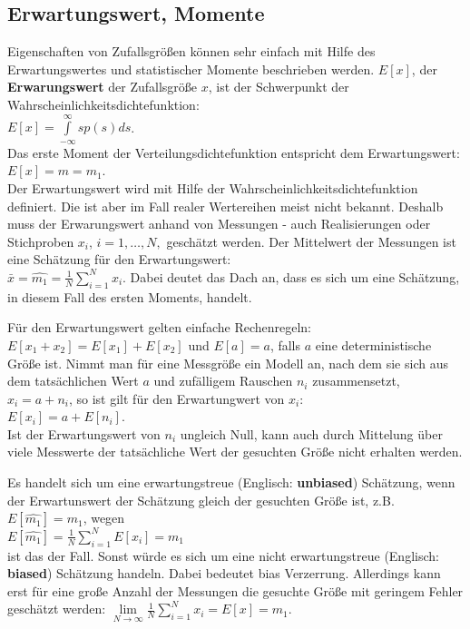 \subsection{Erwartungswert, Momente}
Eigenschaften von Zufallsgrößen können sehr einfach mit Hilfe des Erwartungswertes und statistischer Momente beschrieben werden.  $E[x]$, der {\bf Erwarungswert} der Zufallsgröße $x$, ist der Schwerpunkt der Wahrscheinlichkeitsdichtefunktion:\\
 $E[x] = \int\limits_{-\infty}^{\infty}sp(s)ds$.\\
Das erste Moment der Verteilungsdichtefunktion entspricht dem Erwartungswert: \\
$E[x]=m=m_1$.\\
Der Erwartungswert wird mit Hilfe der Wahrscheinlichkeitsdichtefunktion definiert. Die ist aber im Fall realer Wertereihen meist nicht bekannt. Deshalb muss der Erwarungswert anhand von Messungen - auch Realisierungen oder Stichproben $x_i$,   $i=1,\dots, N,$  geschätzt werden. Der Mittelwert der Messungen ist eine Schätzung für den Erwartungswert:\\
$\bar{x}=\hat{m_1}=\frac{1}{N}\sum \limits_{i=1}^N x_i$.
Dabei deutet das Dach an, dass es sich um eine Schätzung, in diesem Fall des ersten Moments, handelt. 

Für den Erwartungswert gelten einfache Rechenregeln:\\ 
 $E[x_1+x_2]=E[x_1]+E[x_2]$ und $E[a]=a$, falls $a$ eine deterministische Größe ist. Nimmt man für eine Messgröße ein Modell an, nach dem sie sich aus dem tatsächlichen Wert $a$ und zufälligem Rauschen $n_i$  zusammensetzt, $x_i = a + n_i$, so ist gilt für den Erwartungwert von $x_i$:\\
$E[x_i] = a + E[n_i]$.\\
 Ist der Erwartungswert von $n_i$ ungleich Null, kann auch durch Mittelung über viele Messwerte der tatsächliche Wert der gesuchten Größe nicht erhalten werden.

Es handelt sich um eine erwartungstreue (Englisch: {\bf unbiased}) Schätzung, wenn der Erwartunswert der Schätzung gleich der gesuchten Größe ist, z.B. $E[ \hat{m_1} ]= m_1$, wegen\\
$ E[\hat{m_1}] =\frac{1}{N}\sum \limits_{i=1}^N E[x_i] = m_1 $\\
ist das der Fall. Sonst würde es sich um eine nicht erwartungstreue (Englisch: {\bf biased}) Schätzung handeln. Dabei bedeutet bias Verzerrung. Allerdings kann erst für eine große Anzahl der Messungen die gesuchte Größe mit geringem Fehler geschätzt werden: 
 $\lim\limits_{N \to \infty}\frac{1}{N}\sum \limits_{i=1}^N x_i=E[x]=m_1$. 

